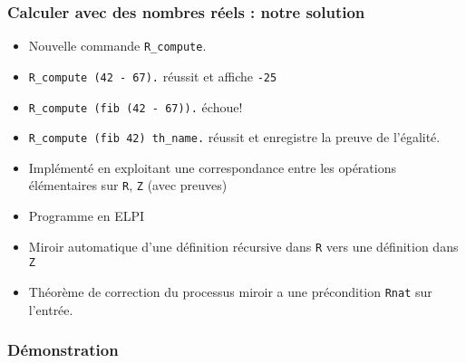 \documentclass[compress]{beamer}
\begin{document}
\begin{frame}[fragile]
\frametitle{Calculer avec des nombres r\'eels : notre solution}
\begin{itemize}
\item Nouvelle commande {\tt R\_compute}.
\item {\tt R\_compute (42 - 67).} r\'eussit et affiche {\tt -25}
\item {\tt R\_compute (fib (42 - 67)).} \'echoue!
\item {\tt R\_compute (fib 42) th\_name.} r\'eussit et enregistre la preuve de l'\'egalit\'e.
\iffalse
\begin{itemize}
\item En respectant le fait que {\tt fib} n'est d\'efini que pour des entr\'ees en nombres naturels
\end{itemize}
\fi
\item Impl\'ement\'e  en exploitant une correspondance entre les op\'erations \'el\'ementaires sur {\tt R}, {\tt Z} (avec preuves)
\item Programme en ELPI
\item Miroir automatique d'une d\'efinition r\'ecursive dans {\tt R} vers une d\'efinition dans {\tt Z}
\item Th\'eor\`eme de correction du processus miroir a une pr\'econdition {\tt Rnat} sur l'entr\'ee.
\end{itemize}
\end{frame}

\begin{frame}
   \frametitle{D\'emonstration}
  
   \end{frame}
\end{document}
